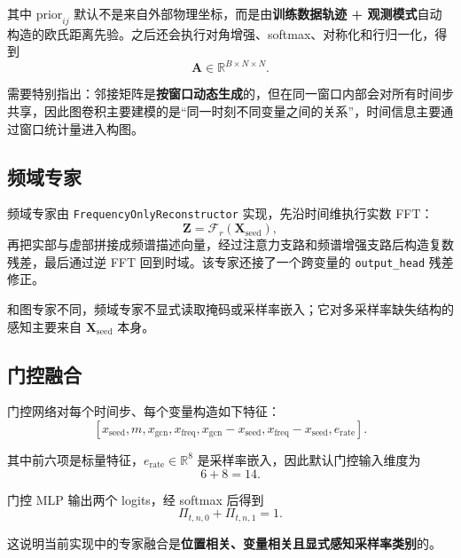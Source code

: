 \documentclass[UTF8]{ctexart}
\newcommand{\code}[1]{\texttt{#1}}
\begin{document}
其中 \(\text{prior}_{ij}\) 默认不是来自外部物理坐标，而是由\textbf{训练数据轨迹 + 观测模式}自动构造的欧氏距离先验。之后还会执行对角增强、softmax、对称化和行归一化，得到
\begin{equation}
    \bm{A}\in\mathbb{R}^{B\times N\times N}.
\end{equation}

需要特别指出：邻接矩阵是\textbf{按窗口动态生成}的，但在同一窗口内部会对所有时间步共享，因此图卷积主要建模的是“同一时刻不同变量之间的关系”，时间信息主要通过窗口统计量进入构图。

\subsection{频域专家}

频域专家由 \code{FrequencyOnlyReconstructor} 实现，先沿时间维执行实数 FFT：
\begin{equation}
    \bm{Z} = \mathcal{F}_r(\bm{X}_{\text{seed}}),
\end{equation}
再把实部与虚部拼接成频谱描述向量，经过注意力支路和频谱增强支路后构造复数残差，最后通过逆 FFT 回到时域。该专家还接了一个跨变量的 \code{output\_head} 残差修正。

和图专家不同，频域专家不显式读取掩码或采样率嵌入；它对多采样率缺失结构的感知主要来自 \(\bm{X}_{\text{seed}}\) 本身。

\subsection{门控融合}

门控网络对每个时间步、每个变量构造如下特征：
\begin{equation}
    \left[
    x_{\text{seed}},
    m,
    x_{\text{gcn}},
    x_{\text{freq}},
    x_{\text{gcn}}-x_{\text{seed}},
    x_{\text{freq}}-x_{\text{seed}},
    e_{\text{rate}}
    \right].
\end{equation}

其中前六项是标量特征，\(e_{\text{rate}}\in\mathbb{R}^8\) 是采样率嵌入，因此默认门控输入维度为
\begin{equation}
    6 + 8 = 14.
\end{equation}

门控 MLP 输出两个 logits，经 softmax 后得到
\begin{equation}
    \Pi_{t,n,0} + \Pi_{t,n,1} = 1.
\end{equation}

这说明当前实现中的专家融合是\textbf{位置相关、变量相关且显式感知采样率类别}的。
\end{document}
